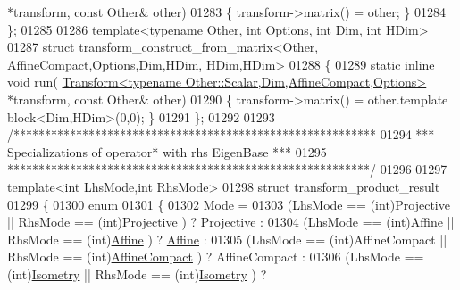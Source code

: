 \begin{DoxyCode}
       *transform, \textcolor{keyword}{const} Other& other)
01283   \{ transform->matrix() = other; \}
01284 \};
01285 
01286 \textcolor{keyword}{template}<\textcolor{keyword}{typename} Other, \textcolor{keywordtype}{int} Options, \textcolor{keywordtype}{int} Dim, \textcolor{keywordtype}{int} HDim>
01287 \textcolor{keyword}{struct }transform\_construct\_from\_matrix<Other, AffineCompact,Options,Dim,HDim, HDim,HDim>
01288 \{
01289   \textcolor{keyword}{static} \textcolor{keyword}{inline} \textcolor{keywordtype}{void} run(
      \hyperlink{group___geometry___module_class_eigen_1_1_transform}{Transform<typename Other::Scalar,Dim,AffineCompact,Options>}
       *transform, \textcolor{keyword}{const} Other& other)
01290   \{ transform->matrix() = other.template block<Dim,HDim>(0,0); \}
01291 \};
01292 
01293 \textcolor{comment}{/**********************************************************}
01294 \textcolor{comment}{***   Specializations of operator* with rhs EigenBase   ***}
01295 \textcolor{comment}{**********************************************************/}
01296 
01297 \textcolor{keyword}{template}<\textcolor{keywordtype}{int} LhsMode,\textcolor{keywordtype}{int} RhsMode>
01298 \textcolor{keyword}{struct }transform\_product\_result
01299 \{
01300   \textcolor{keyword}{enum} 
01301   \{ 
01302     Mode =
01303       (LhsMode == (int)\hyperlink{group__enums_ggaee59a86102f150923b0cac6d4ff05107aead6a2de12a17aaa4f5c523215dfccad}{Projective}    || RhsMode == (\textcolor{keywordtype}{int})\hyperlink{group__enums_ggaee59a86102f150923b0cac6d4ff05107aead6a2de12a17aaa4f5c523215dfccad}{Projective}    ) ? 
      \hyperlink{group__enums_ggaee59a86102f150923b0cac6d4ff05107aead6a2de12a17aaa4f5c523215dfccad}{Projective} :
01304       (LhsMode == (\textcolor{keywordtype}{int})\hyperlink{group__enums_ggaee59a86102f150923b0cac6d4ff05107a71e768e0581725d919d0b05f4cb83234}{Affine}        || RhsMode == (int)\hyperlink{group__enums_ggaee59a86102f150923b0cac6d4ff05107a71e768e0581725d919d0b05f4cb83234}{Affine}        ) ? 
      \hyperlink{group__enums_ggaee59a86102f150923b0cac6d4ff05107a71e768e0581725d919d0b05f4cb83234}{Affine} :
01305       (LhsMode == (int)AffineCompact || RhsMode == (\textcolor{keywordtype}{int})\hyperlink{group__enums_ggaee59a86102f150923b0cac6d4ff05107aa30a06b60d218b709020972df47de2b0}{AffineCompact} ) ? AffineCompact :
01306       (LhsMode == (\textcolor{keywordtype}{int})\hyperlink{group__enums_ggaee59a86102f150923b0cac6d4ff05107a080cd5366173608f701cd945c2335568}{Isometry}      || RhsMode == (int)\hyperlink{group__enums_ggaee59a86102f150923b0cac6d4ff05107a080cd5366173608f701cd945c2335568}{Isometry}      ) ? 

\end{DoxyCode}
